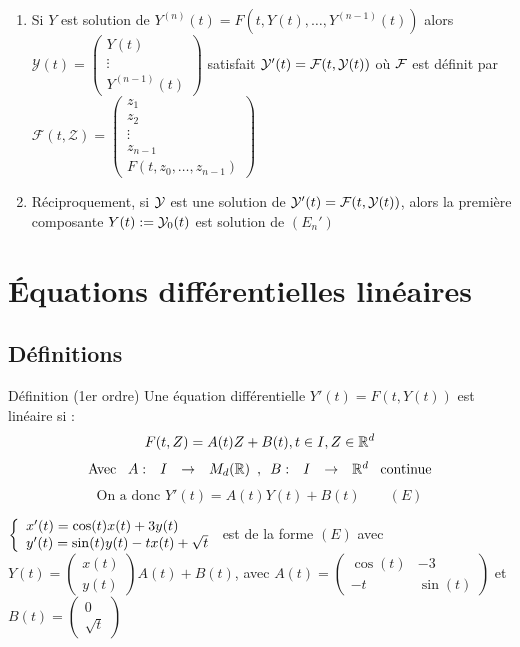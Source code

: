 \documentclass[]{report}
\begin{document}
\begin{prop}{}{}
    \begin{enumerate}
        \item Si $Y$ est solution de $Y^{(n)}(t)=F(t,Y(t),\dots,Y^{(n-1)}(t))$ alors $\mathcal{Y}(t)=\begin{pmatrix}
            Y(t)\\
            \vdots\\
            Y^{(n-1)}(t)
        \end{pmatrix}$ satisfait $\mathcal{Y}'(t)=\mathcal{F}(t,\mathcal{Y}(t))$ où $\mathcal{F}$ est définit par $\mathcal{F}(t,\mathcal{Z})=\begin{pmatrix}
    z_1\\
    z_2\\
    \vdots\\
    z_{n-1}\\
    F(t,z_0,\dots,z_{n-1})
\end{pmatrix}$
        \item Réciproquement, si $\mathcal{Y}$ est une solution de $\mathcal{Y}'(t)=\mathcal{F}(t,\mathcal{Y}(t))$, alors la première composante $Y(t):=\mathcal{Y}_0(t)$ est solution de $(E_n')$
    \end{enumerate}
\end{prop}

\chapter{Équations différentielles linéaires}

\section{Définitions}

\begin{df}{Définition (1er ordre)}{}
    Une équation différentielle $Y'(t)=F(t,Y(t))$ est linéaire si :
    $$F(t,Z)=A(t)Z+B(t),t\in I,Z\in\mathbb{R}^d$$
    $$\text{Avec }\begin{array}{ccccc} A : & I & \to & M_d(\mathbb{R}) \end{array},\begin{array}{ccccc} B : & I & \to & \mathbb{R}^d \end{array}\text{ continue}$$
    $$\text{On a donc }Y'(t)=A(t)Y(t)+B(t)\qquad (E)$$
\end{df}

\begin{ex}{}{}
    $\left\{\begin{array}{ll} x'(t)=\cos(t)x(t)+3y(t)\\
    y'(t)=\sin(t)y(t)-tx(t)+\sqrt{t} \end{array} \right.$   est de la forme $(E)$ avec $Y(t)=\begin{pmatrix}
        x(t)\\
        y(t)
    \end{pmatrix}A(t)+B(t)$, avec $A(t)=\begin{pmatrix}
        \cos(t)&-3\\
        -t&\sin(t)
    \end{pmatrix}$ et $B(t)=\begin{pmatrix}
        0\\
        \sqrt{t}
    \end{pmatrix}$
\end{ex}
\end{document}
